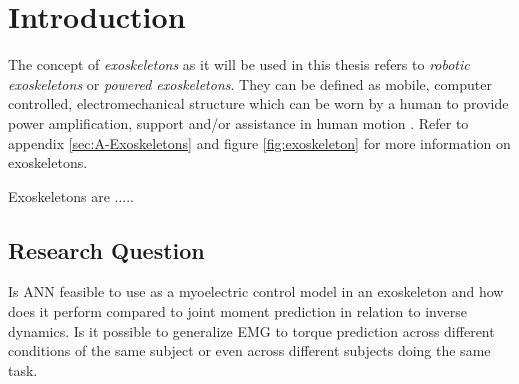 \documentclass[../main.tex]{subfiles}
\begin{document}
\chapter{Introduction}
The concept of \textit{exoskeletons} as it will be used in this thesis refers to \textit{robotic exoskeletons} or \textit{powered exoskeletons}. They can be defined as mobile, computer controlled, electromechanical structure which can be worn by a human to provide power amplification, support and/or assistance in human motion \cite{Anam2012, Gorgey2018}. 
Refer to appendix \ref{sec:A-Exoskeletons} and figure \ref{fig:exoskeleton} for more information on exoskeletons.

Exoskeletons are .....







\section{Research Question}
Is \ac{ANN} feasible to use as a myoelectric control model in an exoskeleton and how does it perform compared to joint moment prediction in relation to inverse dynamics. 
Is it possible to generalize \ac{EMG} to torque prediction across different conditions of the same subject or even across different subjects doing the same task.
\end{document}
